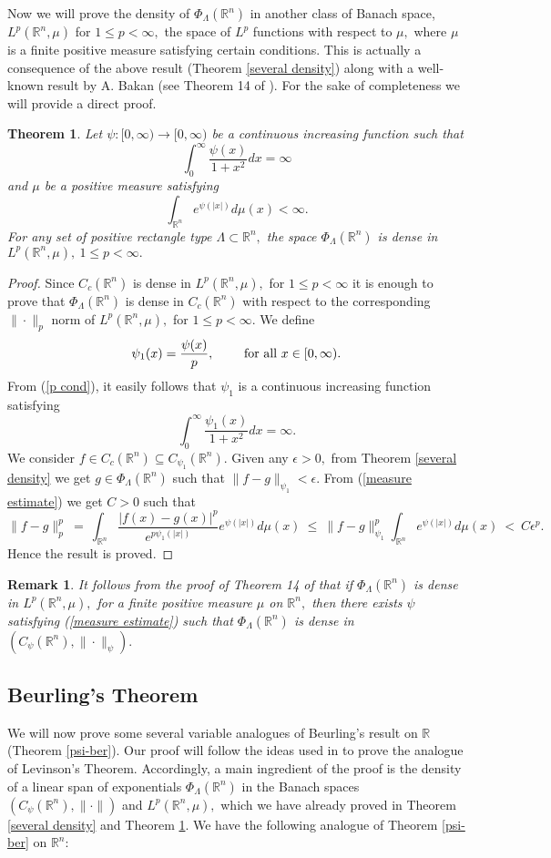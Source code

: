 \documentclass [11pt]{amsart}
\newtheorem{Thm}{Theorem}[section]
\newtheorem{rem}{Remark}[section]
\newcommand{\R}{\mathbb R}
\newcommand{\txt} {\textmd}
\newcommand{\be} {\begin{equation}}
\newcommand{\ee} {\end{equation}}
\numberwithin{equation}{section}
\begin{document}
Now we will prove the density of $\Phi_\Lambda(\R^n)$ in another class of Banach space, $L^p(\R^n,\mu)$ for $1\leq p < \infty,$ the space of $L^p$ functions with respect to $\mu,$  where $\mu$ is a finite positive measure satisfying certain conditions. This is actually a consequence of the above result (Theorem \ref{several density}) along with a well-known result by A. Bakan (see Theorem 14 of \cite{P1}). For the sake of completeness we will provide a direct proof. 
\begin{Thm}\label{Lp dense}
Let $\psi:[0,\infty)\rightarrow [0,\infty)$ be a continuous increasing function such that 
\be\label{p cond} \int_0^\infty\dfrac{\psi(x)}{1+x^2}dx=\infty \ee 
and $\mu$ be a positive measure satisfying 
\be \label{measure estimate} \int_{\R^n} e^{\psi(|x|)}d\mu(x)<\infty. \ee
For any set of positive rectangle type $\Lambda \subset \R^n,$ the space $\Phi_\Lambda(\R^n)$ is dense in $L^p(\R^n,\mu),~ 1\leq p < \infty.$ 
\end{Thm}
\begin{proof}
Since $C_c(\R^n)$ is dense in $L^p(\R^n,\mu),$ for $1\leq p < \infty$ it is enough to prove that $\Phi_\Lambda(\R^n)$ is dense in $C_c(\R^n)$ with respect to the corresponding $\|\cdot\|_p$ norm of $L^p(\R^n,\mu),$ for $1\leq p < \infty.$ We define $$\psi_1(x)=\dfrac{\psi(x)}{p}, \quad \quad  \txt{ for all } x\in [0,\infty).$$ From (\ref{p cond}), it easily follows that $\psi_1$ is a continuous increasing function satisfying 
	$$\int_0^\infty\dfrac{\psi_1(x)}{1+x^2}dx=\infty.$$ 
We consider $f\in C_c(\R^n) \subseteq C_{\psi_1}(\R^n).$ Given any $\epsilon >0,$ from Theorem \ref{several density} we get $g\in \Phi_\Lambda(\R^n)$ such that $\|f-g\|_{\psi_1}<\epsilon.$ From (\ref{measure estimate}) we get $C>0$ such that 
$$\|f-g\|_p^p ~=~ \int_{\R^n}\dfrac{|f(x)-g(x)|^p}{e^{p\psi_1(|x|)}}e^{\psi(|x|)}d\mu(x) ~\leq~ \|f-g\|_{\psi_1}^p \int_{\R^n} e^{\psi(|x|)}d\mu(x) ~<~ C \epsilon^p.$$
Hence the result is proved.
\end{proof}
\begin{rem}
It follows from the proof of Theorem 14 of \cite{P1} that if $\Phi_{\Lambda}(\R^n)$ is dense in $L^p(\R^n,\mu),$ for a finite positive measure $\mu$ on $\R^n,$ then there exists $\psi$ satisfying (\ref{measure estimate}) such that $\Phi_{\Lambda}(\R^n)$ is dense in $(C_\psi(\R^n),\|\cdot\|_\psi).$
\end{rem}

\subsection{Beurling's Theorem}
We will now prove some several variable analogues of Beurling's result on $\R$ (Theorem \ref{psi-ber}). Our proof will follow the ideas used in \cite{BRS} to prove the analogue of Levinson's Theorem. Accordingly, a main ingredient of the proof is the density of a linear span of exponentials $\Phi_{\Lambda}(\R^n)$ in the Banach spaces $(C_{\psi}(\R^n), \|\cdot\|)$ and $L^p(\R^n, \mu),$ which we have already proved in Theorem \ref{several density} and Theorem \ref{Lp dense}. We have the following analogue of Theorem \ref{psi-ber} on $\R^n$:
\end{document}
